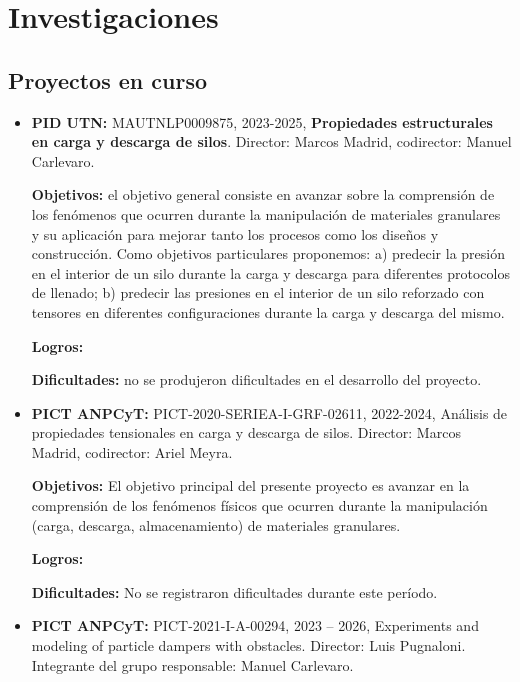 \documentclass[a4paper,11pt,twoside,final,titlepage,onecolumn,openright]{report}
\begin{document}
\section{Investigaciones}

\subsection{Proyectos en curso}

\begin{itemize}
  
\item {\bf PID UTN:} MAUTNLP0009875, 2023-2025, {\bf Propiedades estructurales en carga y descarga de silos}. Director: Marcos Madrid, codirector: Manuel Carlevaro.
 
{\bf Objetivos:} el objetivo general consiste en avanzar sobre la comprensión de los fenómenos que ocurren durante la manipulación de materiales granulares y su aplicación para mejorar tanto los procesos como los diseños y construcción. Como objetivos particulares proponemos: a) predecir la presión en el interior de un silo durante la carga y descarga para diferentes protocolos de llenado; b) predecir las presiones en el interior de un silo reforzado con tensores en diferentes configuraciones durante la carga y descarga del mismo.

{\bf Logros:}  
 
{\bf Dificultades:} no se produjeron dificultades en el desarrollo del proyecto. 


\item \textbf{PICT ANPCyT:} PICT-2020-SERIEA-I-GRF-02611, 2022-2024, Análisis de propiedades tensionales en carga y descarga de silos. Director: Marcos Madrid, codirector: Ariel Meyra.

    \textbf{Objetivos:} El objetivo principal del presente proyecto es avanzar en la comprensión de los fenómenos físicos que ocurren durante la manipulación (carga, descarga, almacenamiento) de materiales granulares. 

    \textbf{Logros:}  


    \textbf{Dificultades:} No se registraron dificultades durante este período.


\item \textbf{PICT ANPCyT:} PICT-2021-I-A-00294, 2023 -- 2026, Experiments and modeling of particle dampers with obstacles. Director: Luis Pugnaloni. Integrante del grupo responsable: Manuel Carlevaro.


\end{itemize}
\end{document}
